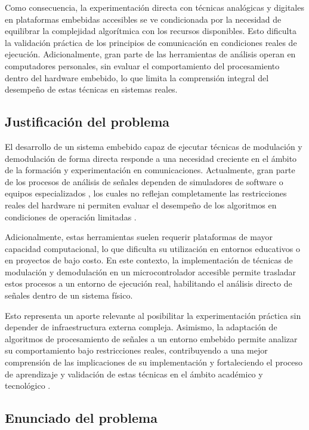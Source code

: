 Como consecuencia, la experimentación directa con técnicas analógicas y digitales en plataformas embebidas accesibles se ve condicionada por la necesidad de equilibrar la complejidad algorítmica con los recursos disponibles. Esto dificulta la validación práctica de los principios de comunicación en condiciones reales de ejecución. Adicionalmente, gran parte de las herramientas de análisis operan en computadores personales, sin evaluar el comportamiento del procesamiento dentro del hardware embebido, lo que limita la comprensión integral del desempeño de estas técnicas en sistemas reales.

\subsection{Justificación del problema}

El desarrollo de un sistema embebido capaz de ejecutar técnicas de modulación y demodulación de forma directa responde a una necesidad creciente en el ámbito de la formación y experimentación en comunicaciones. Actualmente, gran parte de los procesos de análisis de señales dependen de simuladores de software o equipos especializados \cite{oppenheim1997}, los cuales no reflejan completamente las restricciones reales del hardware ni permiten evaluar el desempeño de los algoritmos en condiciones de operación limitadas \cite{heath2002}.

Adicionalmente, estas herramientas suelen requerir plataformas de mayor capacidad computacional, lo que dificulta su utilización en entornos educativos o en proyectos de bajo costo. En este contexto, la implementación de técnicas de modulación y demodulación en un microcontrolador accesible permite trasladar estos procesos a un entorno de ejecución real, habilitando el análisis directo de señales dentro de un sistema físico.

Esto representa un aporte relevante al posibilitar la experimentación práctica sin depender de infraestructura externa compleja. Asimismo, la adaptación de algoritmos de procesamiento de señales a un entorno embebido permite analizar su comportamiento bajo restricciones reales, contribuyendo a una mejor comprensión de las implicaciones de su implementación y fortaleciendo el proceso de aprendizaje y validación de estas técnicas en el ámbito académico y tecnológico \cite{haykin2001}.

\subsection{Enunciado del problema}

